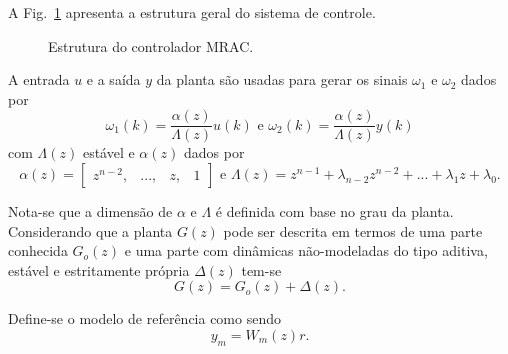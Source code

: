     A Fig.~\ref{fig:cascata} apresenta a estrutura geral do sistema de controle.

    \begin{figure}[htb]
        \renewcommand\figurename{Fig.}
        \caption{Estrutura do controlador MRAC.}
        \label{fig:cascata}
    \end{figure}

    A entrada $u$ e a saída $y$ da planta são usadas para gerar os sinais $\omega_1$ e
    $\omega_2$ dados por
    \begin{equation}
            \omega_1(k) = \frac{\alpha(z)}{\Lambda(z)} u(k) \text{ e }
            \omega_2(k) = \frac{\alpha(z)}{\Lambda(z)} y(k)
        \label{eq:omega_1_2}
    \end{equation}
    com $\Lambda(z)$ estável e $\alpha(z)$ dados por
    \begin{equation*}
        \alpha(z) = \left[ \begin{matrix} z^{n-2}, & ..., & z, & 1 \end{matrix} \right]
        \text{ e }
        \Lambda(z) = z^{n-1} + \lambda_{n-2} z^{n-2} + ... + \lambda_1 z + \lambda_0\text{.}
    \end{equation*}

    Nota-se que a dimensão de $\alpha$ e $\Lambda$ é definida com base no grau da planta.
    Considerando que a planta $G(z)$ pode ser descrita em termos de uma parte conhecida
    $G_o(z)$ e uma parte com dinâmicas não-modeladas do tipo aditiva, estável e estritamente
    própria $\Delta(z)$ tem-se
    \begin{equation}
        G(z) = G_o(z) + \Delta(z) \text{.}
        \label{eq:planta_go_delta}
    \end{equation}

    Define-se o modelo de referência como sendo
    \begin{equation*}
        y_m = W_m(z) r \text{.}
    \end{equation*}

